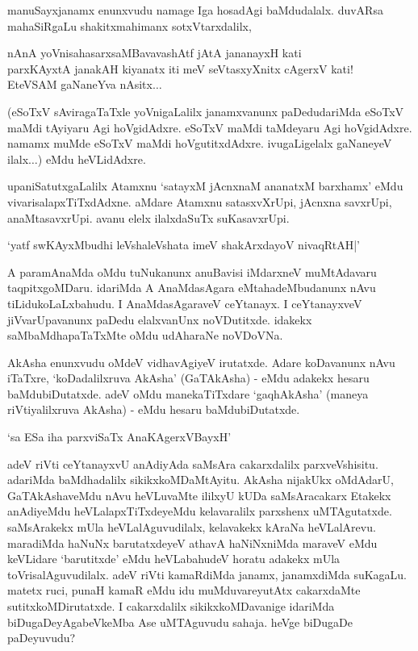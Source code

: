manuSayxjanamx enunxvudu namage Iga hosadAgi baMdudalalx. duvARsa mahaSiRgaLu shakitxmahimanx sotxVtarxdalilx,

\begin{shloka}
nAnA yoVnisahasarxsaMBavavashAtf jAtA jananayxH kati\\
parxKAyxtA janakAH kiyanatx iti meV seVtasxyXnitx cAgerxV kati!\\
EteVSAM gaNaneYva nAsitx$\ldots$ 
\end{shloka}

(eSoTxV sAviragaTaTxle yoVnigaLalilx janamxvanunx paDedudariMda eSoTxV maMdi tAyiyaru Agi hoVgidAdxre. eSoTxV maMdi taMdeyaru Agi hoVgidAdxre. namamx muMde eSoTxV maMdi hoVgutitxdAdxre. ivugaLigelalx gaNaneyeV ilalx$\ldots$) eMdu heVLidAdxre.

upaniSatutxgaLalilx Atamxnu `satayxM jAcnxnaM ananatxM barxhamx' eMdu vivarisalapxTiTxdAdxne. aMdare Atamxnu satasxvXrUpi, jAcnxna savxrUpi, anaMtasavxrUpi. avanu elelx ilalxdaSuTx suKasavxrUpi.

\begin{shloka}
`yatf swKAyxMbudhi leVshaleVshata imeV shakArxdayoV nivaqRtAH|'
\end{shloka}

A paramAnaMda oMdu tuNukanunx anuBavisi iMdarxneV muMtAdavaru taqpitxgoMDaru. idariMda A AnaMdasAgara eMtahadeMbudanunx nAvu tiLidukoLaLxbahudu. I AnaMdasAgaraveV ceYtanayx. I ceYtanayxveV jiVvarUpavanunx paDedu elalxvanUnx noVDutitxde. idakekx saMbaMdhapaTaTxMte oMdu udAharaNe noVDoVNa.

AkAsha enunxvudu oMdeV vidhavAgiyeV irutatxde. Adare koDavanunx nAvu iTaTxre, `koDadalilxruva AkAsha' (GaTAkAsha) - eMdu adakekx hesaru baMdubiDutatxde. adeV oMdu manekaTiTxdare `gaqhAkAsha' (maneya riVtiyalilxruva AkAsha) - eMdu hesaru baMdubiDutatxde.

\begin{shloka}
`sa ESa iha  parxviSaTx AnaKAgerxVBayxH'
\end{shloka}

adeV riVti ceYtanayxvU anAdiyAda saMsAra cakarxdalilx parxveVshisitu. adariMda baMdhadalilx sikikxkoMDaMtAyitu. AkAsha nijakUkx oMdAdarU, GaTAkAshaveMdu nAvu heVLuvaMte ililxyU kUDa saMsAracakarx Etakekx anAdiyeMdu heVLalapxTiTxdeyeMdu kelavaralilx parxshenx uMTAgutatxde. saMsArakekx mUla heVLalAguvudilalx, kelavakekx kAraNa heVLalArevu. maradiMda haNuNx barutatxdeyeV athavA haNiNxniMda maraveV eMdu keVLidare `barutitxde' eMdu heVLabahudeV horatu adakekx mUla toVrisalAguvudilalx. adeV riVti kamaRdiMda janamx, janamxdiMda suKagaLu. matetx ruci, punaH kamaR eMdu idu muMduvareyutAtx cakarxdaMte sutitxkoMDirutatxde. I cakarxdalilx sikikxkoMDavanige idariMda biDugaDeyAgabeVkeMba Ase uMTAguvudu sahaja. heVge biDugaDe paDeyuvudu?


